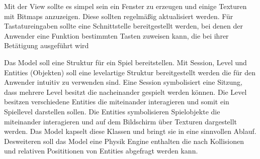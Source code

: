Mit der View sollte es simpel sein ein Fenster zu erzeugen und einige Texturen mit Bitmaps anzuzeigen. Diese sollten regelmäßig aktualisiert werden. Für Tastatureingaben sollte eine Schnittstelle bereitgestellt werden, bei denen der Anwender eine Funktion bestimmten Tasten zuweisen kann, die bei ihrer Betätigung ausgeführt wird

Das Model soll eine Struktur für ein Spiel bereitstellen. Mit Session, Level und Entities (Objekten) soll eine levelartige Struktur bereitgestellt werden die für den Anwender intuitiv zu verwenden sind. Eine Session symbolisiert eine Sitzung, dass mehrere Level besitzt die nacheinander gespielt werden können. Die Level besitzen verschiedene Entities die miteinander interagieren und somit ein Spiellevel darstellen sollen. Die Entities symbolisieren Spielobjekte die miteinander interagieren und auf dem Bildschirm über Texturen dargestellt werden. Das Model kapselt diese Klassen und bringt sie in eine sinnvollen Ablauf. Desweiteren soll das Model eine Physik Engine enthalten die nach Kollisionen und relativen Posititionen von Entities abgefragt werden kann.